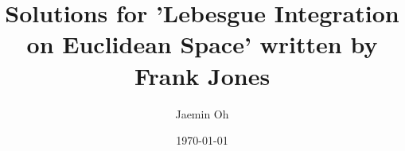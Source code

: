 \documentclass{amsart}
\date{\today}
\begin{document}
\author{Jaemin Oh}

\title{Solutions for 'Lebesgue Integration on Euclidean Space' written by Frank Jones}

\maketitle

















\end{document}
